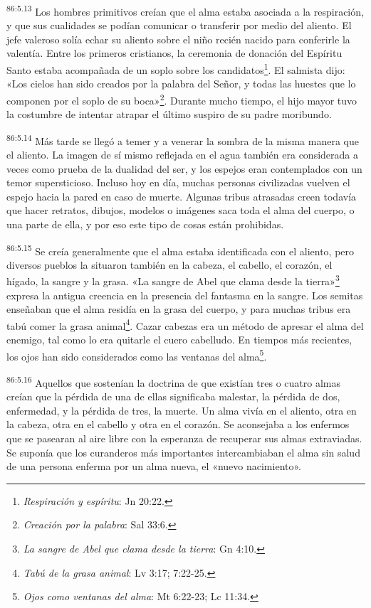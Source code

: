 \par
\textsuperscript{86:5.13} Los hombres primitivos creían que el alma estaba asociada a la respiración, y que sus cualidades se podían comunicar o transferir por medio del aliento. El jefe valeroso solía echar su aliento sobre el niño recién nacido para conferirle la valentía. Entre los primeros cristianos, la ceremonia de donación del Espíritu Santo estaba acompañada de un soplo sobre los candidatos\footnote{\textit{Respiración y espíritu}: Jn 20:22.}. El salmista dijo: «Los cielos han sido creados por la palabra del Señor, y todas las huestes que lo componen por el soplo de su boca»\footnote{\textit{Creación por la palabra}: Sal 33:6.}. Durante mucho tiempo, el hijo mayor tuvo la costumbre de intentar atrapar el último suspiro de su padre moribundo.

\par
\textsuperscript{86:5.14} Más tarde se llegó a temer y a venerar la sombra de la misma manera que el aliento. La imagen de sí mismo reflejada en el agua también era considerada a veces como prueba de la dualidad del ser, y los espejos eran contemplados con un temor supersticioso. Incluso hoy en día, muchas personas civilizadas vuelven el espejo hacia la pared en caso de muerte. Algunas tribus atrasadas creen todavía que hacer retratos, dibujos, modelos o imágenes saca toda el alma del cuerpo, o una parte de ella, y por eso este tipo de cosas están prohibidas.

\par
\textsuperscript{86:5.15} Se creía generalmente que el alma estaba identificada con el aliento, pero diversos pueblos la situaron también en la cabeza, el cabello, el corazón, el hígado, la sangre y la grasa. «La sangre de Abel que clama desde la tierra»\footnote{\textit{La sangre de Abel que clama desde la tierra}: Gn 4:10.} expresa la antigua creencia en la presencia del fantasma en la sangre. Los semitas enseñaban que el alma residía en la grasa del cuerpo, y para muchas tribus era tabú comer la grasa animal\footnote{\textit{Tabú de la grasa animal}: Lv 3:17; 7:22-25.}. Cazar cabezas era un método de apresar el alma del enemigo, tal como lo era quitarle el cuero cabelludo. En tiempos más recientes, los ojos han sido considerados como las ventanas del alma\footnote{\textit{Ojos como ventanas del alma}: Mt 6:22-23; Lc 11:34.}.

\par
\textsuperscript{86:5.16} Aquellos que sostenían la doctrina de que existían tres o cuatro almas creían que la pérdida de una de ellas significaba malestar, la pérdida de dos, enfermedad, y la pérdida de tres, la muerte. Un alma vivía en el aliento, otra en la cabeza, otra en el cabello y otra en el corazón. Se aconsejaba a los enfermos que se pasearan al aire libre con la esperanza de recuperar sus almas extraviadas. Se suponía que los curanderos más importantes intercambiaban el alma sin salud de una persona enferma por un alma nueva, el «nuevo nacimiento».

